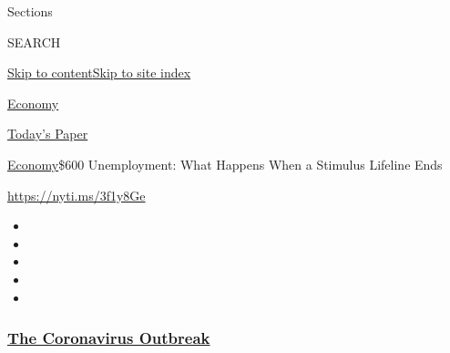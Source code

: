 Sections

SEARCH

\protect\hyperlink{site-content}{Skip to
content}\protect\hyperlink{site-index}{Skip to site index}

\href{https://www.nytimes3xbfgragh.onion/section/business/economy}{Economy}

\href{https://myaccount.nytimes3xbfgragh.onion/auth/login?response_type=cookie\&client_id=vi}{}

\href{https://www.nytimes3xbfgragh.onion/section/todayspaper}{Today's
Paper}

\href{/section/business/economy}{Economy}\textbar{}\$600 Unemployment:
What Happens When a Stimulus Lifeline Ends

\url{https://nyti.ms/3f1y8Ge}

\begin{itemize}
\item
\item
\item
\item
\item
\end{itemize}

\hypertarget{the-coronavirus-outbreak}{%
\subsubsection{\texorpdfstring{\href{https://www.nytimes3xbfgragh.onion/news-event/coronavirus?name=styln-coronavirus-national\&region=TOP_BANNER\&variant=undefined\&block=storyline_menu_recirc\&action=click\&pgtype=Interactive\&impression_id=8c437000-e39a-11ea-adda-c17bab336bc5}{The
Coronavirus
Outbreak}}{The Coronavirus Outbreak}}\label{the-coronavirus-outbreak}}

